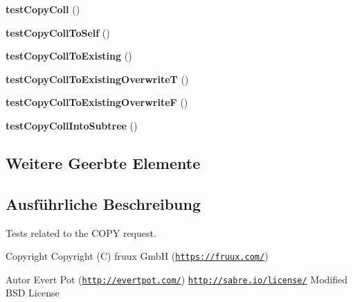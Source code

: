 \begin{DoxyCompactItemize}
\item 
\mbox{\label{class_sabre_1_1_d_a_v_1_1_http_copy_test_a94256f4b87253407f9dfb3be5bed6b40}} 
{\bfseries test\+Copy\+Coll} ()
\item 
\mbox{\label{class_sabre_1_1_d_a_v_1_1_http_copy_test_ab0809b17cc0079434611735ed7fa2a04}} 
{\bfseries test\+Copy\+Coll\+To\+Self} ()
\item 
\mbox{\label{class_sabre_1_1_d_a_v_1_1_http_copy_test_a1d79a1334f43eabae26389feb1e68f30}} 
{\bfseries test\+Copy\+Coll\+To\+Existing} ()
\item 
\mbox{\label{class_sabre_1_1_d_a_v_1_1_http_copy_test_a49a60340c1c134fdb76d91a9fbde89b8}} 
{\bfseries test\+Copy\+Coll\+To\+Existing\+OverwriteT} ()
\item 
\mbox{\label{class_sabre_1_1_d_a_v_1_1_http_copy_test_abe4b90b1cefa5c0623d57bb92c9dfa89}} 
{\bfseries test\+Copy\+Coll\+To\+Existing\+OverwriteF} ()
\item 
\mbox{\label{class_sabre_1_1_d_a_v_1_1_http_copy_test_aacbe1ad3a1000aa4135d2c47409181e1}} 
{\bfseries test\+Copy\+Coll\+Into\+Subtree} ()
\end{DoxyCompactItemize}
\subsection*{Weitere Geerbte Elemente}


\subsection{Ausführliche Beschreibung}
Tests related to the C\+O\+PY request.

\begin{DoxyCopyright}{Copyright}
Copyright (C) fruux GmbH (\href{https://fruux.com/}{\tt https\+://fruux.\+com/}) 
\end{DoxyCopyright}
\begin{DoxyAuthor}{Autor}
Evert Pot (\href{http://evertpot.com/}{\tt http\+://evertpot.\+com/})  \href{http://sabre.io/license/}{\tt http\+://sabre.\+io/license/} Modified B\+SD License 
\end{DoxyAuthor}


